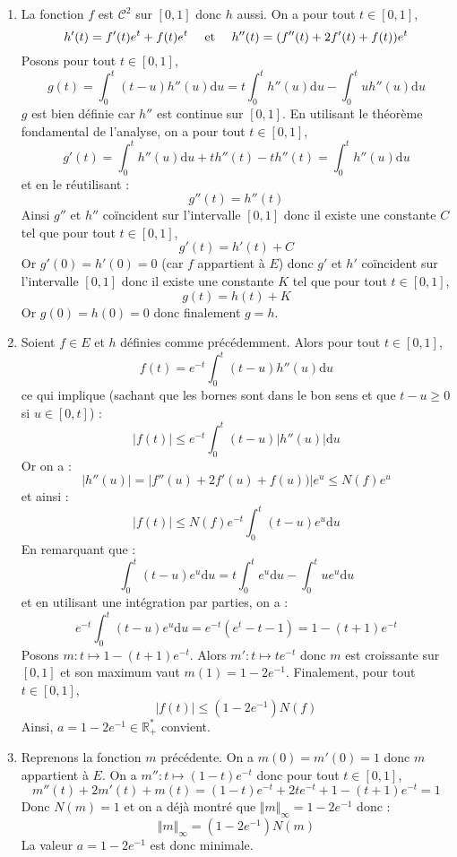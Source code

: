 \documentclass[a4paper,10pt]{report}
\begin{document}
\begin{enumerate}
\item La fonction $f$ est $\mathcal{C}^2$ sur $[0,1]$ donc $h$ aussi. On a pour tout $t \in [0,1]$,
$$ h'(t) = f'(t)e^t +f(t)e^t \quad \hbox{ et } \quad h''(t) =(f''(t)+2f'(t)+f(t))e^t$$
Posons pour tout $t \in [0,1]$,
$$ g(t) = \int_{0}^t (t-u) h''(u) \textrm{d}u = t \int_{0}^t h''(u) \textrm{d}u - \int_{0}^t u h''(u) \textrm{d}u$$
$g$ est bien définie car $h''$ est continue sur $[0,1]$. En utilisant le théorème fondamental de l'analyse, on a pour tout $t \in [0,1]$,
$$ g'(t) = \int_{0}^t h''(u) \textrm{d}u + th''(t)- th''(t) = \int_{0}^t h''(u) \textrm{d}u$$
et en le réutilisant :
$$ g''(t) = h''(t)$$
Ainsi $g''$ et $h''$ coïncident sur l'intervalle $[0,1]$ donc il existe une constante $C$ tel que pour tout $t \in [0,1]$,
$$ g'(t)=h'(t) + C$$
Or $g'(0)=h'(0)=0$ (car $f$ appartient à $E$) donc $g'$ et $h'$ coïncident sur l'intervalle $[0,1]$ donc il existe une constante $K$ tel que pour tout $t \in [0,1]$,
$$ g(t)=h(t)+K$$
Or $g(0)=h(0)=0$ donc finalement $g=h$.
\item Soient $f \in E$ et $h$ définies comme précédemment. Alors pour tout $t \in [0,1]$,
$$ f(t) = e^{-t} \int_{0}^t (t-u) h''(u) \textrm{d}u$$
ce qui implique (sachant que les bornes sont dans le bon sens et que $t-u \geq 0$ si $u \in [0,t]$) :
$$  \vert f(t) \vert \leq e^{-t} \int_{0}^t (t-u) \vert h''(u) \vert  \textrm{d}u$$
Or on a :
$$ \vert h''(u) \vert = \vert f''(u)+2f'(u)+f(u)) \vert e^u \leq N(f) e^u$$
et ainsi :
$$ \vert f(t) \vert \leq  N(f) e^{-t} \int_{0}^t (t-u) e^u\textrm{d}u$$
En remarquant que :
$$ \int_{0}^t (t-u) e^u\textrm{d}u = t \int_{0}^t e^u \textrm{d}u - \int_{0}^t u e^u \textrm{d}u$$
et en utilisant une intégration par parties, on a :
$$  e^{-t} \int_{0}^t (t-u) e^u\textrm{d}u = e^{-t}(e^t-t-1) = 1 -(t+1)e^{-t}$$
Posons $m : t \mapsto 1-(t+1)e^{-t}$. Alors $m' : t \mapsto t e^{-t}$ donc $m$ est croissante sur $[0,1]$ et son maximum vaut $m(1)= 1-2e^{-1}$. Finalement, pour tout $t \in [0,1]$,
$$ \vert f(t) \vert \leq (1-2e^{-1}) N(f) $$
Ainsi, $a = 1-2e^{-1} \in \mathbb{R}_+^{*}$ convient.
\item Reprenons la fonction $m$ précédente. On a $m(0)=m'(0)=1$ donc $m$ appartient à $E$. On a $m'' : t \mapsto (1-t)e^{-t}$ donc pour tout $t \in [0,1]$,
$$ m''(t)+2m'(t)+m(t) = (1-t)e^{-t} +2t e^{-t} +1 -(t+1)e^{-t} = 1$$
Donc $N(m) =1$ et on a déjà montré que $\Vert m \Vert_{\infty}=1-2 e^{-1}$ donc :
$$ \Vert m \Vert_{\infty}=(1-2 e^{-1}) N(m)$$
La valeur $a = 1-2e^{-1}$ est donc minimale.
\end{enumerate}
\end{document}
